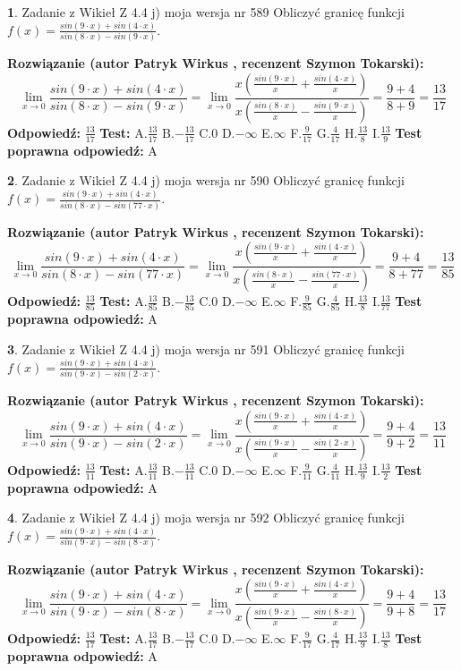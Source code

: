 \documentclass[12pt, a4paper]{article}
\theoremstyle{definition} %
\newtheorem{zad}{}
\newcommand{\zadStart}[1]{\begin{zad}#1\newline}
\newcommand{\zadStop}{\end{zad}}
\newcommand{\rozwStart}[2]{\noindent \textbf{Rozwiązanie (autor #1 , recenzent #2): }\newline}
\newcommand{\rozwStop}{\newline}
\newcommand{\odpStart}{\noindent \textbf{Odpowiedź:}\newline}
\newcommand{\odpStop}{\newline}
\newcommand{\testStart}{\noindent \textbf{Test:}\newline}
\newcommand{\testStop}{\newline}
\newcommand{\kluczStart}{\noindent \textbf{Test poprawna odpowiedź:}\newline}
\newcommand{\kluczStop}{\newline}
\begin{document}
\zadStart{Zadanie z Wikieł Z 4.4 j) moja wersja nr 589}
Obliczyć granicę funkcji $f(x)=\frac{sin(9\cdot x) +sin(4\cdot x)}{sin(8\cdot x) -sin(9\cdot x)}$.
\zadStop
\rozwStart{Patryk Wirkus}{Szymon Tokarski}
$$\lim\limits_{x\to 0}\frac{sin(9\cdot x) +sin(4\cdot x)}{sin(8\cdot x) -sin(9\cdot x)}=\lim\limits_{x\to 0}\frac{x(\frac{sin(9\cdot x)}{x}+\frac{sin(4\cdot x)}{x})}{x(\frac{sin(8\cdot x)}{x}-\frac{sin(9\cdot x)}{x})}=\frac{9+4}{8+9} = \frac{13}{17}$$
\rozwStop
\odpStart
$\frac{13}{17}$
\odpStop
\testStart
A.$\frac{13}{17}$
B.$-\frac{13}{17}$
C.$0$
D.$-\infty$
E.$\infty$
F.$\frac{9}{17}$
G.$\frac{4}{17}$
H.$\frac{13}{8}$
I.$\frac{13}{9}$
\testStop
\kluczStart
A
\kluczStop



\zadStart{Zadanie z Wikieł Z 4.4 j) moja wersja nr 590}
Obliczyć granicę funkcji $f(x)=\frac{sin(9\cdot x) +sin(4\cdot x)}{sin(8\cdot x) -sin(77\cdot x)}$.
\zadStop
\rozwStart{Patryk Wirkus}{Szymon Tokarski}
$$\lim\limits_{x\to 0}\frac{sin(9\cdot x) +sin(4\cdot x)}{sin(8\cdot x) -sin(77\cdot x)}=\lim\limits_{x\to 0}\frac{x(\frac{sin(9\cdot x)}{x}+\frac{sin(4\cdot x)}{x})}{x(\frac{sin(8\cdot x)}{x}-\frac{sin(77\cdot x)}{x})}=\frac{9+4}{8+77} = \frac{13}{85}$$
\rozwStop
\odpStart
$\frac{13}{85}$
\odpStop
\testStart
A.$\frac{13}{85}$
B.$-\frac{13}{85}$
C.$0$
D.$-\infty$
E.$\infty$
F.$\frac{9}{85}$
G.$\frac{4}{85}$
H.$\frac{13}{8}$
I.$\frac{13}{77}$
\testStop
\kluczStart
A
\kluczStop



\zadStart{Zadanie z Wikieł Z 4.4 j) moja wersja nr 591}
Obliczyć granicę funkcji $f(x)=\frac{sin(9\cdot x) +sin(4\cdot x)}{sin(9\cdot x) -sin(2\cdot x)}$.
\zadStop
\rozwStart{Patryk Wirkus}{Szymon Tokarski}
$$\lim\limits_{x\to 0}\frac{sin(9\cdot x) +sin(4\cdot x)}{sin(9\cdot x) -sin(2\cdot x)}=\lim\limits_{x\to 0}\frac{x(\frac{sin(9\cdot x)}{x}+\frac{sin(4\cdot x)}{x})}{x(\frac{sin(9\cdot x)}{x}-\frac{sin(2\cdot x)}{x})}=\frac{9+4}{9+2} = \frac{13}{11}$$
\rozwStop
\odpStart
$\frac{13}{11}$
\odpStop
\testStart
A.$\frac{13}{11}$
B.$-\frac{13}{11}$
C.$0$
D.$-\infty$
E.$\infty$
F.$\frac{9}{11}$
G.$\frac{4}{11}$
H.$\frac{13}{9}$
I.$\frac{13}{2}$
\testStop
\kluczStart
A
\kluczStop



\zadStart{Zadanie z Wikieł Z 4.4 j) moja wersja nr 592}
Obliczyć granicę funkcji $f(x)=\frac{sin(9\cdot x) +sin(4\cdot x)}{sin(9\cdot x) -sin(8\cdot x)}$.
\zadStop
\rozwStart{Patryk Wirkus}{Szymon Tokarski}
$$\lim\limits_{x\to 0}\frac{sin(9\cdot x) +sin(4\cdot x)}{sin(9\cdot x) -sin(8\cdot x)}=\lim\limits_{x\to 0}\frac{x(\frac{sin(9\cdot x)}{x}+\frac{sin(4\cdot x)}{x})}{x(\frac{sin(9\cdot x)}{x}-\frac{sin(8\cdot x)}{x})}=\frac{9+4}{9+8} = \frac{13}{17}$$
\rozwStop
\odpStart
$\frac{13}{17}$
\odpStop
\testStart
A.$\frac{13}{17}$
B.$-\frac{13}{17}$
C.$0$
D.$-\infty$
E.$\infty$
F.$\frac{9}{17}$
G.$\frac{4}{17}$
H.$\frac{13}{9}$
I.$\frac{13}{8}$
\testStop
\kluczStart
A
\kluczStop
\end{document}
